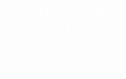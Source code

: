 \newcommand{\cccvname}{Ivan Dugalic}
\newcommand{\cccvjobtitle}{Software Architect}

\NoBgThispage
\AddToShipoutPicture*{\BackgroundPic}
\vspace*{18.5cm}
\noindent
\textcolor{white}{
{\Huge CV\_ \cccvname}\\[8pt]
{\huge (\cccvjobtitle)}\\
\\[8pt]
{\Large idugalic | \today}
}

